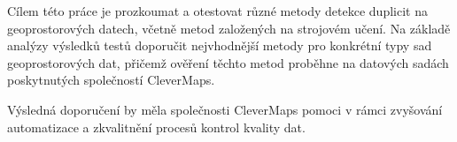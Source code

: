 Cílem této práce je prozkoumat a otestovat různé metody detekce duplicit na geoprostorových datech, včetně metod založených na strojovém učení. Na základě analýzy výsledků testů doporučit nejvhodnější metody pro konkrétní typy sad geoprostorových dat, přičemž ověření těchto metod proběhne na datových sadách poskytnutých společností CleverMaps.

Výsledná doporučení by měla společnosti CleverMaps pomoci v rámci zvyšování automatizace a zkvalitnění procesů kontrol kvality dat.

